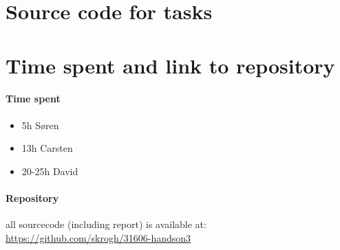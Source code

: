 


\newpage





\appendix

\section{Source code for tasks}






\section{Time spent and link to repository}

\paragraph{ Time spent }
\begin{itemize}
  \item 5h Søren
  \item 13h Carsten
  \item 20-25h David
\end{itemize}

\paragraph{ Repository }
all sourcecode (including report) is available at:
\url{ https://github.com/skrogh/31606-handson3 }



